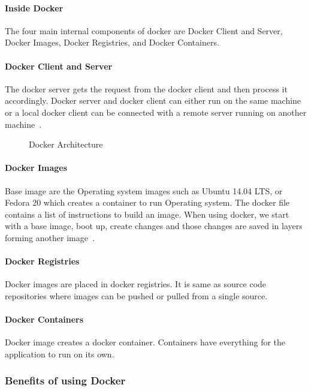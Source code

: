 	
	\paragraph{Inside Docker}
	The four main internal components of docker are Docker Client and
  Server, Docker Images, Docker Registries, and Docker Containers.

	\paragraph{Docker Client and Server}
	The docker server gets the request from the docker client and
  then process it accordingly. Docker server and docker client 
  can either run on the same machine or a local docker client
  can be connected with a remote server running on another
  machine~\cite{turnbull2014docker}.
	
	\begin{figure}
		\centering
		\caption{Docker Architecture~\cite{turnbull2014docker}}\label{fig:figure1} 
	\end{figure}
    
	\paragraph{Docker Images}
	Base image are the Operating system images such as Ubuntu 14.04 LTS,
  or Fedora 20 which creates a container to run Operating system.  The
  docker file contains a list of instructions to build an image.  When
  using docker, we start with a base image, boot up, create changes
  and those changes are saved in layers forming another
  image~\cite{rad2017introduction}.
  
	\paragraph{Docker Registries}
	Docker images are placed in docker registries. It is same as source
  code repositories where images can be pushed or pulled from a single
  source.
	
  \paragraph{Docker Containers}
	Docker image creates a docker container. Containers have everything
  for the application to run on its own.
	
	\subsubsection{Benefits of using Docker}
  
